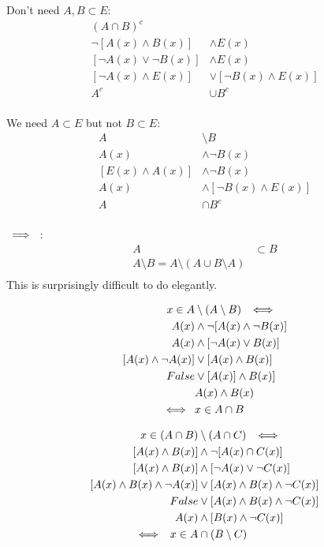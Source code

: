\documentclass{article}
\newcommand{\nl}[0]{\newline}
\newcommand{\rimp}[1][5]{\kern#1px \Longrightarrow \kern#1px}
\newcommand{\cimp}[1][5]{\kern#1px \iff \kern#1px}
\begin{document}
\begin{flushleft}
 \nl
Don't need $A, B \subset E$: 
$$\begin{aligned}
(A \cap B)^c \\
\neg[A(x) \wedge B(x)] &\wedge E(x) \\
[\neg A(x) \vee \neg B(x)] &\wedge E(x) \\
[\neg A(x) \wedge E(x)] &\vee [\neg B(x) \wedge E(x)] \\
A^c &\cup B^c \\
\end{aligned}$$

 \nl
We need $A \subset E$ but not $B \subset E$:
$$\begin{aligned}
A &\setminus B \\
A(x) &\wedge \neg B(x) \\
[E(x) \wedge A(x)] &\wedge \neg B(x) \\
A(x) &\wedge [\neg B(x) \wedge E(x)]\\
A &\cap B^c \\
\end{aligned}$$

\fbox{$A \subset B \cimp A \setminus B = \emptyset$} \nl
$\rimp$ :
$$ \begin{aligned}
A &\subset B \\
A \setminus B = A \setminus (A \cup B \setminus A) \\
\end{aligned} $$
This is surprisingly difficult to do elegantly. \nl

 \nl
$$\begin{aligned}
x \in A &\setminus (A \setminus B) \cimp \\
A(x) &\wedge \neg [A(x) \wedge \neg B(x)] \\
A(x) &\wedge [\neg A(x) \vee B(x)] \\
[A(x) \wedge \neg A(x)] &\vee [A(x) \wedge B(x)] \\
False &\vee [A(x)] \wedge B(x)] \\
&A(x) \wedge B(x) \\
\cimp & x \in A \cap B\\
\end{aligned}$$

 \nl
$$ \begin{aligned}
x \in (A \cap B) &\setminus (A \cap C) \cimp \\
[A(x) \wedge B(x)] &\wedge \neg [A(x) \cap C(x)] \\
[A(x) \wedge B(x)] &\wedge [\neg A(x) \vee \neg C(x)] \\
[A(x) \wedge B(x) \wedge \neg A(x)] &\vee [A(x) \wedge B(x) \wedge \neg C(x)] \\
False &\vee [A(x) \wedge B(x) \wedge \neg C(x)] \\
A(x) &\wedge [B(x) \wedge \neg C(x)] \\
\cimp x \in A &\cap (B \setminus C)\\
\end{aligned}$$


\end{flushleft}
\end{document}
